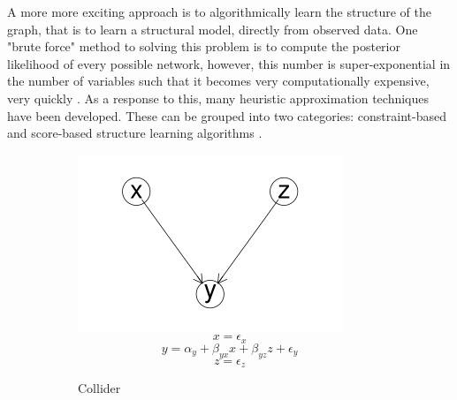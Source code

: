 \documentclass{article}
\begin{document}
A more more exciting approach is to algorithmically learn the structure of the graph, that is to learn a structural model, directly from observed data. One "brute force" method to solving this problem is to compute the posterior likelihood of every possible network, however, this number is super-exponential in the number of variables such that it becomes very computationally expensive, very quickly \parencite{chickering1996learning}. As a response to this, many heuristic approximation techniques have been developed. These can be grouped into two categories: constraint-based and score-based structure learning algorithms \parencite{spirtes1991algorithm} \parencite{verma1991equivalence}. 

\begin{figure}

  \centering
  \begin{subfigure}{0.3\textwidth}
    \centering
    \includegraphics[width=\linewidth]{images/collider.png} 
    \small
    \begin{equation*}
      x = \epsilon_{x}
    \end{equation*}
    \begin{equation*}
      y = \alpha_y + \beta_{yx} x + \beta_{yz} z + \epsilon_{y}
    \end{equation*}
    \begin{equation*}
      z = \epsilon_{z}
    \end{equation*}
    \caption{Collider}
    \label{collider}
  \end{subfigure}
  \begin{subfigure}{0.3\textwidth}

\end{subfigure}
\end{figure}
\end{document}
